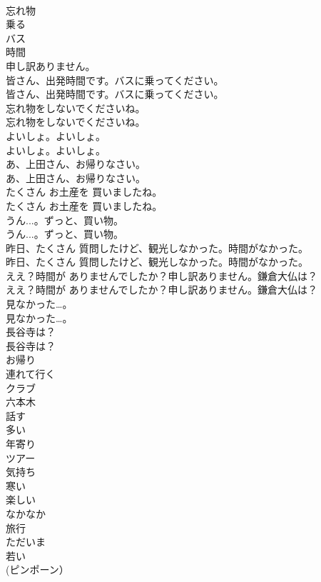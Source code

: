 \documentclass[8pt]{extreport}
\begin{document}
\begin{CJK}{UTF8}{min}
\\	忘れ物
\\	乗る
\\	バス
\\	時間
\\	申し訳ありません。
\\	皆さん、出発時間です。バスに乗ってください。	
\\	皆さん、出発時間です。バスに乗ってください。 
\\	忘れ物をしないでくださいね。	
\\	忘れ物をしないでくださいね。 
\\	よいしょ。よいしょ。	
\\	よいしょ。よいしょ。 
\\	あ、上田さん、お帰りなさい。	
\\	あ、上田さん、お帰りなさい。 
\\	たくさん お土産を 買いましたね。	
\\	たくさん お土産を 買いましたね。 
\\	うん...。ずっと、買い物。	
\\	うん...。ずっと、買い物。 
\\	昨日、たくさん 質問したけど、観光しなかった。時間がなかった。	
\\	昨日、たくさん 質問したけど、観光しなかった。時間がなかった。 
\\	ええ？時間が ありませんでしたか？申し訳ありません。鎌倉大仏は？	
\\	ええ？時間が ありませんでしたか？申し訳ありません。鎌倉大仏は？ 
\\	見なかった…。	
\\	見なかった…。 
\\	長谷寺は？	
\\	長谷寺は？ 
\\	お帰り
\\	連れて行く
\\	クラブ
\\	六本木
\\	話す
\\	多い
\\	年寄り
\\	ツアー
\\	気持ち
\\	寒い
\\	楽しい
\\	なかなか
\\	旅行
\\	ただいま
\\	若い
\\	(ピンポーン）	

\end{CJK}
\end{document}
